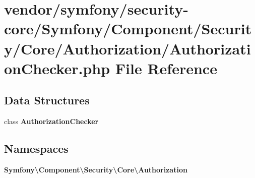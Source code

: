 \section{vendor/symfony/security-\/core/\+Symfony/\+Component/\+Security/\+Core/\+Authorization/\+Authorization\+Checker.php File Reference}
\label{_authorization_checker_8php}
\subsection*{Data Structures}
\begin{DoxyCompactItemize}
\item 
class {\bf Authorization\+Checker}
\end{DoxyCompactItemize}
\subsection*{Namespaces}
\begin{DoxyCompactItemize}
\item 
 {\bf Symfony\textbackslash{}\+Component\textbackslash{}\+Security\textbackslash{}\+Core\textbackslash{}\+Authorization}
\end{DoxyCompactItemize}

